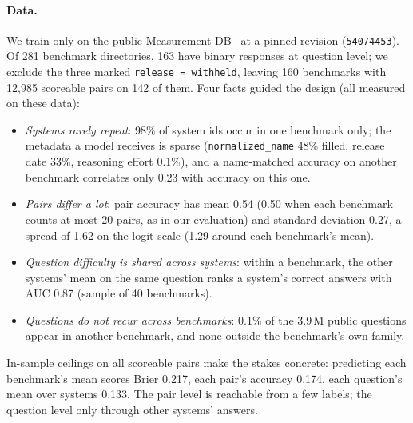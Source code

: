 \documentclass{article}
\newcommand{\code}[1]{\texttt{#1}}
\begin{document}
\paragraph{Data.} We train only on the public Measurement DB~\citep{measurementdb} at a pinned revision (\code{54074453}). Of 281 benchmark directories, 163 have binary responses at question level; we exclude the three marked \code{release = withheld}, leaving 160 benchmarks with 12{,}985 scoreable pairs on 142 of them. Four facts guided the design (all measured on these data):
\begin{itemize}
  \item \emph{Systems rarely repeat}: 98\% of system ids occur in one benchmark only; the metadata a model receives is sparse (\code{normalized\_name} 48\% filled, release date 33\%, reasoning effort 0.1\%), and a name-matched accuracy on another benchmark correlates only 0.23 with accuracy on this one.
  \item \emph{Pairs differ a lot}: pair accuracy has mean 0.54 (0.50 when each benchmark counts at most 20 pairs, as in our evaluation) and standard deviation 0.27, a spread of 1.62 on the logit scale (1.29 around each benchmark's mean).
  \item \emph{Question difficulty is shared across systems}: within a benchmark, the other systems' mean on the same question ranks a system's correct answers with AUC 0.87 (sample of 40 benchmarks).
  \item \emph{Questions do not recur across benchmarks}: 0.1\% of the 3.9\,M public questions appear in another benchmark, and none outside the benchmark's own family.
\end{itemize}
In-sample ceilings on all scoreable pairs make the stakes concrete: predicting each benchmark's mean scores Brier 0.217, each pair's accuracy 0.174, each question's mean over systems 0.133. The pair level is reachable from a few labels; the question level only through other systems' answers.
\end{document}
